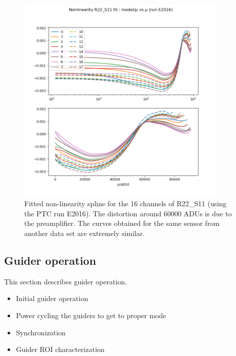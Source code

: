\begin{figure}
\begin{centering}
\includegraphics[width=0.9\textwidth]{sections/figures/E2016_nonlin_model.png}
\end{centering}
\caption{Fitted non-linearity spline for the 16 channels of R22\_S11 (using the PTC run E2016). The distortion around 60000 ADUs is due to the preamplifier. The curves obtained for the same sensor from another data set are extremely similar. \label{fig:nonlin_model}}


\end{figure}



\subsection{Guider operation}\label{guider-operation}

This section describes guider operation.

\begin{itemize}
\tightlist
\item
  Initial guider operation
\item
  Power cycling the guiders to get to proper mode
\item
  Synchronization
\item
  Guider ROI characterization
\end{itemize}

